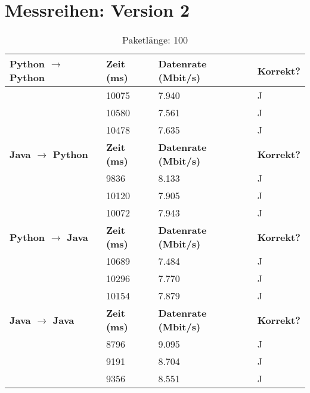 \documentclass{article}
\begin{document}
\section{Messreihen: Version 2}
\begin{table}[]
\caption{Paketlänge: 100}
\label{tab:my-table}
\begin{tabular}{|l|l|l|l|}
\hline
\textbf{Python $\rightarrow$ Python} & \textbf{Zeit (ms)} & \textbf{Datenrate (Mbit/s)} & \textbf{Korrekt?} \\ \hline
                            & 10075      & 7.940         & J        \\ \cline{2-4} 
                            & 10580      & 7.561         & J        \\ \cline{2-4} 
                            & 10478      & 7.635         & J        \\ \hline
\textbf{Java $\rightarrow$ Python}   & \textbf{Zeit (ms)} & \textbf{Datenrate (Mbit/s)} & \textbf{Korrekt?} \\ \hline
                            & 9836       & 8.133         & J        \\ \cline{2-4} 
                            & 10120      & 7.905         & J        \\ \cline{2-4} 
                            & 10072      & 7.943         & J        \\ \hline
\textbf{Python $\rightarrow$ Java}  & \textbf{Zeit (ms)} & \textbf{Datenrate (Mbit/s)} & \textbf{Korrekt?} \\ \hline
                            & 10689      & 7.484         & J        \\ \cline{2-4} 
                            & 10296      & 7.770         & J        \\ \cline{2-4} 
                            & 10154      & 7.879         & J        \\ \hline
\textbf{Java $\rightarrow$ Java}   & \textbf{Zeit (ms)} & \textbf{Datenrate (Mbit/s)} & \textbf{Korrekt?} \\ \hline
                            & 8796       & 9.095         & J        \\ \cline{2-4} 
                            & 9191       & 8.704         & J        \\ \cline{2-4} 
                            & 9356       & 8.551         & J        \\ \hline
\end{tabular}
\end{table}
\end{document}
